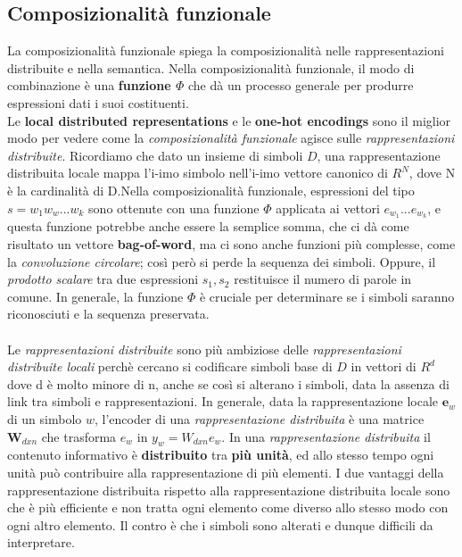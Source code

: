 \subsection{Composizionalità funzionale}
La composizionalità funzionale spiega la composizionalità nelle rappresentazioni distribuite e nella semantica. Nella composizionalità funzionale, il modo di combinazione è una \textbf{funzione $\Phi$} che dà un processo generale per produrre espressioni dati i suoi costituenti. \\
Le \textbf{local distributed representations} e le \textbf{one-hot encodings} sono il miglior modo per vedere come la \textit{composizionalità funzionale} agisce sulle \textit{rappresentazioni distribuite}. Ricordiamo che dato un insieme di simboli $D$, una rappresentazione distribuita locale mappa l'i-imo simbolo nell'i-imo vettore canonico di $R^N$, dove N è la cardinalità di D.Nella composizionalità funzionale, espressioni del tipo $s=w_1w_w...w_k$ sono ottenute con una funzione $\Phi$ applicata ai vettori $e_{w_1}...e_{w_{k}}$, e questa funzione potrebbe anche essere la semplice somma, che ci dà come risultato un vettore \textbf{bag-of-word}, ma ci sono anche funzioni più complesse, come la \textit{convoluzione circolare}; così però si perde la sequenza dei simboli. Oppure, il \textit{prodotto scalare} tra due espressioni $s_1, s_2$ restituisce il numero di parole in comune. In generale, la funzione $\Phi$ è cruciale per determinare se i simboli saranno riconosciuti e la sequenza preservata. 
\\ \\ 
Le \textit{rappresentazioni distribuite} sono più ambiziose delle \textit{rappresentazioni distribuite locali} perchè cercano si codificare simboli base di $D$ in vettori di $R^d$ dove d è molto minore di n, anche se così si alterano i simboli, data la assenza di link tra simboli e rappresentazioni. In generale, data la rappresentazione locale $\textbf{e}_w$ di un simbolo $w$, l'encoder di una \textit{rappresentazione distribuita} è una matrice $\textbf{W}_{dxn}$ che trasforma $e_w$ in $y_w=W_{dxn}e_w$. In una \textit{rappresentazione distribuita} il contenuto informativo è \textbf{distribuito} tra \textbf{più unità}, ed allo stesso tempo ogni unità può contribuire alla rappresentazione di più elementi. 
I due vantaggi della rappresentazione distribuita rispetto alla rappresentazione distribuita locale sono che è più efficiente e non tratta ogni elemento come diverso allo stesso modo con ogni altro elemento. Il contro è che i simboli sono alterati e dunque difficili da interpretare. \\ 
